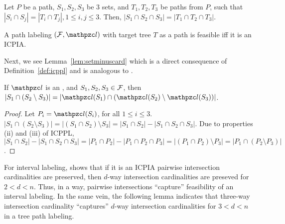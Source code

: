 \begin{lemma}
  \label{lem:intersection-cardinality} 
  Let $P$ be a path, $S_1, S_2, S_3$ be 3 sets, and $T_1, T_2, T_3$ be
  paths from $P$, such that $|S_i \cap S_j |=|T_i \cap T_j|, 1 \leq
  i,j \leq 3$.  Then, $|S_1 \cap S_2 \cap S_3| = |T_1 \cap T_2 \cap
  T_3|$.
\end{lemma}
\begin{lemma}
  \label{lem:icpia} 
  A path labeling $(\cF, \cl)$ with target tree $T$ as a path is
  feasible iff it is an ICPIA.
\end{lemma}

Next, we see Lemma~\ref{lem:setminuscard} which is a direct
consequence of Definition~\ref{def:icppl} and is analogous to
\cite[Cor.~1]{nsnrs09}.

\begin{lemma}
  \label{lem:setminuscard}
  If $\cl$ is an \ICPPL, and $S_1, S_2, S_3 \in {\cal F}$, then $|S_1 \cap
  (S_2 \setminus S_3)| = |\cl(S_1) \cap (\cl(S_2) \setminus
  \cl(S_3))|$.
\end{lemma}
\begin{proof}\thesisspacing%
  Let $P_i = \cl(S_i)$, for all $1 \le i \le 3$.  $|S_1 \cap (S_2
  \setminus S_3)| = |(S_1 \cap S_2) \setminus S_3| = |S_1 \cap S_2| -
  |S_1 \cap S_2 \cap S_3|$. Due to properties (ii) and (iii) of ICPPL,
  $|S_1 \cap S_2| - |S_1 \cap S_2 \cap S_3| = |P_1 \cap P_2| - |P_1
  \cap P_2 \cap P_3| = |(P_1 \cap P_2) \setminus P_3| = |P_1 \cap (P_2
  \setminus P_3)|$. %
\end{proof}

For interval labeling, \cite{nsnrs09} shows that if it is an ICPIA \ie
pairwise intersection cardinalities are preserved, then $d$-way
intersection cardinalities are preseved for $2 < d < n$. Thus, in a
way, pairwise intersections ``capture'' feasibility of an interval
labeling. In the same vein, the following lemma indicates that
three-way intersection cardinality ``captures'' $d$-way intersection
cardinalities for $3 < d < n$ in a tree path labeling.

